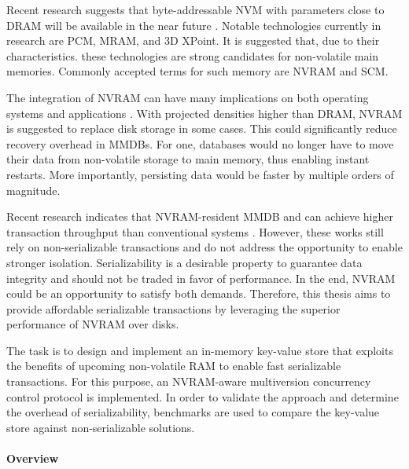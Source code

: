 Recent research suggests that byte-addressable \ac{NVM} with parameters close to
\ac{DRAM} will be available in the near future \cite{dulloor2014system,
oukid2017data, andrei2017sap}. Notable technologies currently in research are
\ac{PCM}, \ac{MRAM}, and 3D XPoint. It is suggested that, due to their
characteristics. these technologies are strong candidates for non-volatile main
memories. Commonly accepted terms for such memory are \ac{NVRAM} and \ac{SCM}.

The integration of \ac{NVRAM} can have many implications on both operating
systems and applications \cite{condit2009better, bailey2011operating,
pelley2013storage, boehm2016persistence}. With projected densities higher than
\ac{DRAM}, \ac{NVRAM} is suggested to replace disk storage in some cases. This
could significantly reduce recovery overhead in \acp{MMDB}. For one, databases
would no longer have to move their data from non-volatile storage to main
memory, thus enabling instant restarts. More importantly, persisting data would
be faster by multiple orders of magnitude.


Recent research indicates that NVRAM-resident \ac{MMDB} and \kvsp can achieve
higher transaction throughput than conventional systems
\cite{bailey2013exploring, zhou2016nvht}. However, these works still rely on
non-serializable transactions and do not address the opportunity to enable
stronger isolation. Serializability is a desirable property to guarantee data
integrity and should not be traded in favor of performance. In the end,
\ac{NVRAM} could be an opportunity to satisfy both demands. Therefore, this
thesis aims to provide affordable serializable transactions by leveraging the
superior performance of \ac{NVRAM} over disks.


The task is to design and implement an in-memory key-value store that exploits
the benefits of upcoming non-volatile \ac{RAM} to enable fast serializable
transactions. For this purpose, an \ac{NVRAM}-aware multiversion concurrency
control protocol is implemented. In order to validate the approach and determine
the overhead of serializability, benchmarks are used to compare the key-value
store against non-serializable solutions.


\paragraph{Overview}

